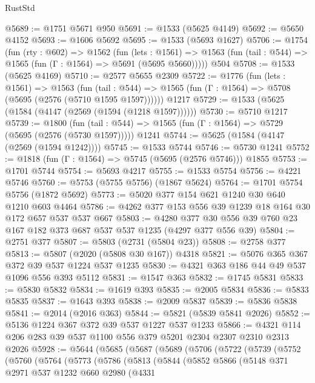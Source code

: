 \begin{lexlean}{RustStd}
\begin{coremodule}
@5689 := @1751 @5671 @950
@5691 := @1533 (@5625 @4149)
@5692 := @5650 @4152
@5693 := @1606 @5692
@5695 := @1533 (@5693 @1627)
@5706 := @1754
    (fun (rty : @602) =>
    @1562
      (fun (lets : @1561) =>
      @1563 (fun (tail : @544) => @1565 (fun (Γ : @1564) => @5691 (@5695 @5660)))))
    @504
@5708 := @1533 (@5625 @4169)
@5710 := @2577 @5655 @2309
@5722 := @1776
    (fun (lets : @1561) =>
    @1563
      (fun (tail : @544) => @1565 (fun (Γ : @1564) => @5708 (@5695 (@2576 (@5710 @1595 @1597))))))
    @1217
@5729 := @1533 (@5625 (@1584 (@4147 (@2569 (@1594 (@1218 @1597))))))
@5730 := @5710 @1217
@5739 := @1800
    (fun (tail : @544) => @1565 (fun (Γ : @1564) => @5729 (@5695 (@2576 (@5730 @1597)))))
    @1241
@5744 := @5625 (@1584 (@4147 (@2569 (@1594 @1242))))
@5745 := @1533 @5744
@5746 := @5730 @1241
@5752 := @1818 (fun (Γ : @1564) => @5745 (@5695 (@2576 @5746))) @1855
@5753 := @1701 @5744
@5754 := @5693 @4217
@5755 := @1533 @5754
@5756 := @4221 @5746
@5760 := @5753 (@5755 @5756) (@1867 @5624)
@5764 := @1701 @5754 @5756 (@1872 @5692)
@5773 := @5020 @377 @154 @621 @1240 @30 @640 @1210 @603 @4464
@5786 := @4262 @377 @153 @556 @39 @1239 @18 @164 @30 @172 @657 @537 @537 @667
@5803 := @4280 @377 @30 @556 @39 @760 @23 @167 @182 @373 @687 @537 @537 @1235 (@4297 @377 @556 @39)
@5804 := @2751 @377
@5807 := @5803 (@2731 (@5804 @23))
@5808 := @2758 @377
@5813 := @5807 (@2020 (@5808 @30 @167)) @4318
@5821 := @5076 @365 @367 @372 @39 @537 @1224 @537 @1235
@5830 := @4321 @363 @186 @44 @49 @537 @1096 @556 @393 @5112
@5831 := @1547 @363
@5832 := @1745 @5831
@5833 := @5830 @5832
@5834 := @1619 @393
@5835 := @2005 @5834
@5836 := @5833 @5835
@5837 := @1643 @393
@5838 := @2009 @5837
@5839 := @5836 @5838
@5841 := @2014 (@2016 @363)
@5844 := @5821 (@5839 @5841 @2026)
@5852 := @5136 @1224 @367 @372 @39 @537 @1227 @537 @1233
@5866 := @4321 @114 @206 @283 @39 @537 @1100 @556 @379 @5201 @2304 @2307 @2310 @2313 @2026
@5928 := @5644
    (@5685
      (@5687
        (@5689
          (@5706
            (@5722
              (@5739
                (@5752
                  (@5760
                    (@5764
                      (@5773
                        (@5786
                          (@5813
                            (@5844
                              (@5852
                                @5866
                                (@5148
                                  @371
                                  @2971
                                  @537
                                  @1232
                                  @660
                                  @2980
                                  (@4331

\end{coremodule}
\end{lexlean}
